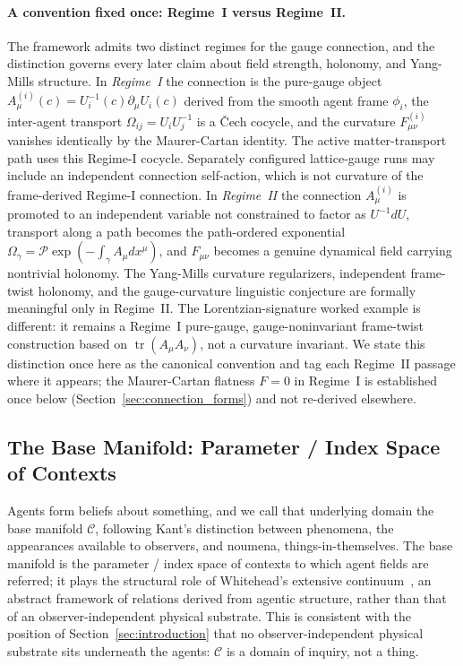 \documentclass[11pt]{article}
\begin{document}
\paragraph{A convention fixed once: Regime~I versus Regime~II.}
\label{sec:regime_convention}
The framework admits two distinct regimes for the gauge connection, and the distinction governs every later claim about field strength, holonomy, and Yang-Mills structure. In \emph{Regime~I} the connection is the pure-gauge object $A^{(i)}_\mu(c) = U_i^{-1}(c)\partial_\mu U_i(c)$ derived from the smooth agent frame $\phi_i$, the inter-agent transport $\Omega_{ij} = U_iU_j^{-1}$ is a \v{C}ech cocycle, and the curvature $F^{(i)}_{\mu\nu}$ vanishes identically by the Maurer-Cartan identity. The active matter-transport path uses this Regime-I cocycle. Separately configured lattice-gauge runs may include an independent connection self-action, which is not curvature of the frame-derived Regime-I connection. In \emph{Regime~II} the connection $A^{(i)}_\mu$ is promoted to an independent variable not constrained to factor as $U^{-1}dU$, transport along a path becomes the path-ordered exponential $\Omega_\gamma = \mathcal{P}\exp(-\int_\gamma A_\mu dx^\mu)$, and $F_{\mu\nu}$ becomes a genuine dynamical field carrying nontrivial holonomy. The Yang-Mills curvature regularizers, independent frame-twist holonomy, and the gauge-curvature linguistic conjecture are formally meaningful only in Regime~II. The Lorentzian-signature worked example is different: it remains a Regime~I pure-gauge, gauge-noninvariant frame-twist construction based on $\operatorname{tr}(A_\mu A_\nu)$, not a curvature invariant. We state this distinction once here as the canonical convention and tag each Regime~II passage where it appears; the Maurer-Cartan flatness $F = 0$ in Regime~I is established once below (Section~\ref{sec:connection_forms}) and not re-derived elsewhere.

\subsection{The Base Manifold: Parameter / Index Space of Contexts}

Agents form beliefs about something, and we call that underlying domain the base manifold $\mathcal{C}$, following Kant's distinction between phenomena, the appearances available to observers, and noumena, things-in-themselves. The base manifold is the parameter / index space of contexts to which agent fields are referred; it plays the structural role of Whitehead's extensive continuum~\cite{Whitehead1929}, an abstract framework of relations derived from agentic structure, rather than that of an observer-independent physical substrate. This is consistent with the position of Section~\ref{sec:introduction} that no observer-independent physical substrate sits underneath the agents: $\mathcal{C}$ is a domain of inquiry, not a thing.
\end{document}
